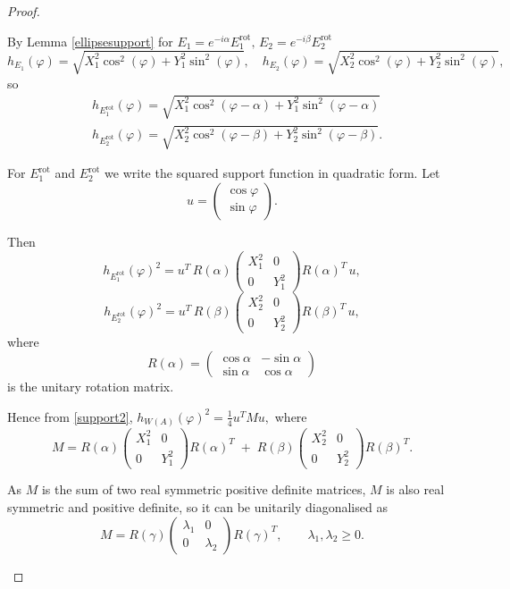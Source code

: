 \documentclass[10pt,a4paper]{amsart}
\renewcommand{\phi}{\varphi}
\begin{document}
\begin{proof}
\begin{enumerate}
By Lemma \ref{ellipsesupport} for $E_1 = e^{-i \alpha}E_1^{\text{rot}}, \, E_2 = e^{-i \beta}E_2^{\text{rot}}$
\[
h_{E_1}(\phi) = \sqrt{X_1^2 \cos^2 (\phi) + Y_1^2 \sin^2 (\phi)},\quad
h_{E_2}(\phi) = \sqrt{X_2^2 \cos^2 (\phi) + Y_2^2 \sin^2 (\phi)},
\]
so 
\[
\begin{aligned}
&h_{E_1^{\text{rot}}}(\phi) = \sqrt{X_1^2 \cos^2(\phi-\alpha) + Y_1^2 \sin^2(\phi-\alpha)}\\
&h_{E_2^{\text{rot}}}(\phi) = \sqrt{X_2^2 \cos^2(\phi-\beta) + Y_2^2 \sin^2(\phi-\beta)}.
\end{aligned}
\]



For $E_1^{\mathrm{rot}}$ and $E_2^{\mathrm{rot}}$ we write the squared support function in quadratic form.  
Let 
\[
u = \begin{pmatrix} \cos\phi \\  \sin\phi \end{pmatrix}.
\]

Then
\[
h_{E_1^{\mathrm{rot}}}(\phi)^2 
= u^T \, R(\alpha)
\begin{pmatrix} X_1^2 & 0 \\  0 & Y_1^2 \end{pmatrix}
R(\alpha)^T \, u,
\]
\[
h_{E_2^{\mathrm{rot}}}(\phi)^2 
= u^T \, R(\beta)
\begin{pmatrix} X_2^2 & 0 \\  0 & Y_2^2 \end{pmatrix}
R(\beta)^T \, u,
\]
where \[
R(\alpha) =
\begin{pmatrix}
\cos\alpha & -\sin\alpha \\
\sin\alpha & \cos\alpha
\end{pmatrix}
\]
is the unitary rotation matrix.


Hence from \eqref{support2}, $h_{W(A)}(\phi)^2 = \frac{1}{4}u^T M u,$ where
\begin{equation}\label{M}
    M = R(\alpha)\begin{pmatrix}X_1^2&0\\0&Y_1^2\end{pmatrix}R(\alpha)^T
\;+\;R(\beta)\begin{pmatrix}X_2^2&0\\0&Y_2^2\end{pmatrix}R(\beta)^T.
\end{equation}


As $M$ is the sum of two real symmetric positive definite matrices, $M$ is also real symmetric and positive definite, so it can be unitarily diagonalised as
\[
M = R(\gamma)
\begin{pmatrix}\lambda_1 & 0 \\  0 & \lambda_2\end{pmatrix}
R(\gamma)^T, \qquad \lambda_1,\lambda_2 \geq 0.
\]


\end{enumerate}
\end{proof}
\end{document}
